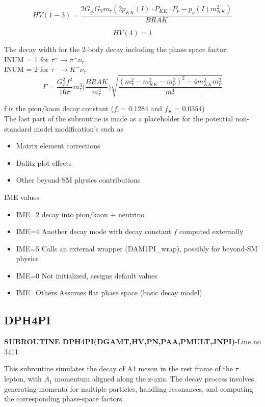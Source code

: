 \documentclass[12pt]{article}
\begin{document}
\[ HV(1-3) = \frac{2G_AG_Vm_\tau (2p_{KK}(I) \cdot P_{KK} \cdot P_\nu - p_\nu(I) m_{KK}^2)}{BRAK}  \]

\[HV(4) = 1 \]

The decay width for the 2-body decay including the phase space factor.\\

INUM = 1 for $\tau^- \rightarrow \pi^- \nu_\tau$\\
INUM = 2 for $\tau^- \rightarrow K^- \nu_\tau$\\

\[\Gamma = \frac{G_F^2 f^2}{16\pi}m_\tau^3\Big(\frac{BRAK}{m_\tau^4}\Big)\sqrt{\frac{(m_\tau^2-m_{KK}^2-m_\nu^2)^2-4m_{KK}^2m_\nu^2}{m_\tau^4}}\]

f is the pion/kaon decay constant ($f_\pi$= 0.1284 and $f_{K} = 0.0354$)\\

The last part of the subroutine is made as a placeholder for the potential non-standard model modification's such as
\begin{itemize}
    \item Matrix element corrections
    \item Dalitz plot effects
    \item Other beyond-SM physics contributions
\end{itemize}

IME values\\
\begin{itemize}
    \item IME=2 decay into pion/kaon + neutrino
    \item IME=4 Another decay mode with decay constant $f$ computed externally
    \item IME=5 Calls an external wrapper (DAM1PI\_wrap), possibly for beyond-SM physics
    \item IME=0 Not initialized, assigns default values
    \item IME=Others Assumes flat phase space (basic decay model)
\end{itemize}

\subsection{DPH4PI}
\textbf{SUBROUTINE DPH4PI(DGAMT,HV,PN,PAA,PMULT,JNPI)}-Line no 3411

This subroutine simulates the decay of A1 meson in the rest frame of the $\tau$ lepton, with $A_1$ momentum aligned along the z-axis. The decay process involves generating momenta for multiple particles, handling resonances, and computing the corresponding phase-space factors.
\end{document}
